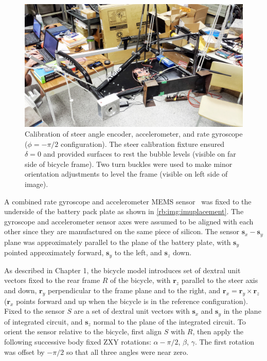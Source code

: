 \begin{figure}[ht]
  \centering
  \includegraphics[width=\textwidth]{images/20130711_163732_2.jpg}
  \caption{Calibration of steer angle encoder, accelerometer, and rate
    gyroscope ($\phi=-\pi/2$ configuration). The steer calibration fixture
    ensured $\delta=0$ and provided surfaces to rest the bubble levels (visible
    on far side of bicycle frame). Two turn buckles were used to make minor
  orientation adjustments to level the frame (visible on left side of image).}
  \label{rb:img:calibration}
\end{figure}

A combined rate gyroscope and accelerometer MEMS
sensor~\cite{InvensenseMPU6050} was fixed to the underside of the battery pack
plate as shown in \autoref{rb:img:imuplacement}. The gyroscope and
accelerometer sensor axes were assumed to be aligned with each other since they
are manufactured on the same piece of silicon. The sensor $\bm{s}_x-\bm{s}_y$
plane was approximately parallel to the plane of the battery plate, with
$\bm{s}_y$ pointed approximately forward, $\bm{s}_y$ to the left, and
$\bm{s}_z$ down.

As described in Chapter 1, the bicycle model introduces set of dextral unit
vectors fixed to the rear frame $R$ of the bicycle, with $\bm{r}_z$ parallel to
the steer axis and down, $\bm{r}_y$ perpendicular to the frame plane and to the
right, and $\bm{r}_x = \bm{r}_y \times \bm{r}_z$ ($\bm{r}_x$ points forward and
up when the bicycle is in the reference configuration). Fixed to the sensor $S$
are a set of dextral unit vectors with $\bm{s}_x$ and $\bm{s}_y$ in the plane
of integrated circuit, and $\bm{s}_z$ normal to the plane of the integrated
circuit. To orient the sensor relative to the bicycle, first align $S$ with
$R$, then apply the following successive body fixed ZXY rotations: $\alpha -
\pi/2$, $\beta$, $\gamma$. The first rotation was offset by $-\pi/2$ so that
all three angles were near zero.

